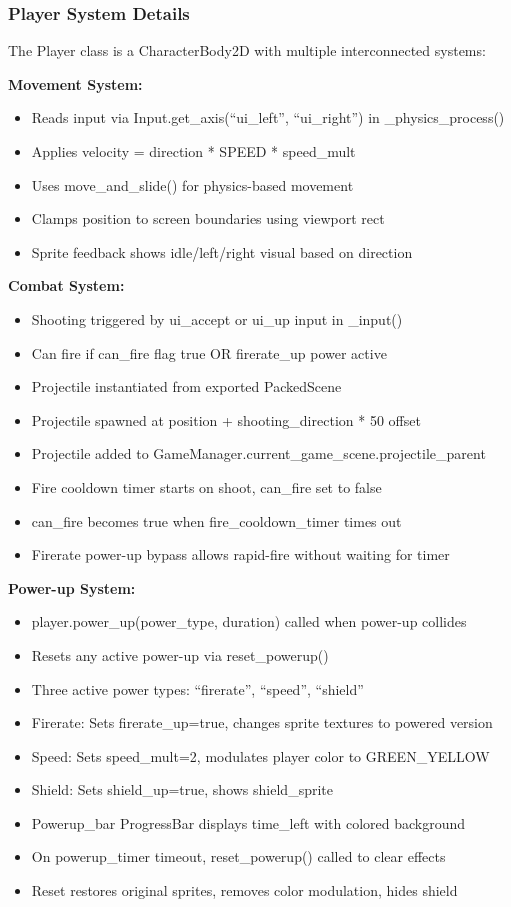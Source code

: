 \documentclass{article}
\begin{document}
\subsubsection{Player System Details}

The Player class is a CharacterBody2D with multiple interconnected systems:

\textbf{Movement System:}
\begin{itemize}
    \item Reads input via Input.get\_axis(``ui\_left'', ``ui\_right'') in \_physics\_process()
    \item Applies velocity = direction * SPEED * speed\_mult
    \item Uses move\_and\_slide() for physics-based movement
    \item Clamps position to screen boundaries using viewport rect
    \item Sprite feedback shows idle/left/right visual based on direction
\end{itemize}

\textbf{Combat System:}
\begin{itemize}
    \item Shooting triggered by ui\_accept or ui\_up input in \_input()
    \item Can fire if can\_fire flag true OR firerate\_up power active
    \item Projectile instantiated from exported PackedScene
    \item Projectile spawned at position + shooting\_direction * 50 offset
    \item Projectile added to GameManager.current\_game\_scene.projectile\_parent
    \item Fire cooldown timer starts on shoot, can\_fire set to false
    \item can\_fire becomes true when fire\_cooldown\_timer times out
    \item Firerate power-up bypass allows rapid-fire without waiting for timer
\end{itemize}

\textbf{Power-up System:}
\begin{itemize}
    \item player.power\_up(power\_type, duration) called when power-up collides
    \item Resets any active power-up via reset\_powerup()
    \item Three active power types: ``firerate'', ``speed'', ``shield''
    \item Firerate: Sets firerate\_up=true, changes sprite textures to powered version
    \item Speed: Sets speed\_mult=2, modulates player color to GREEN\_YELLOW
    \item Shield: Sets shield\_up=true, shows shield\_sprite
    \item Powerup\_bar ProgressBar displays time\_left with colored background
    \item On powerup\_timer timeout, reset\_powerup() called to clear effects
    \item Reset restores original sprites, removes color modulation, hides shield
\end{itemize}
\end{document}
